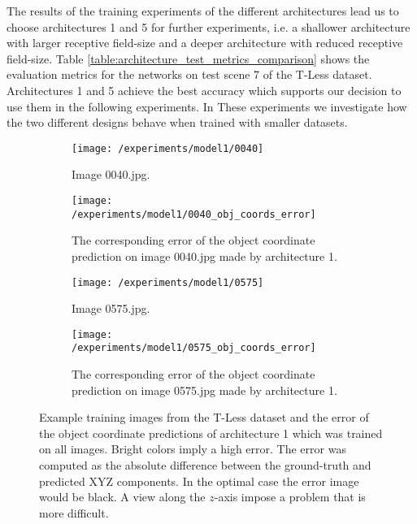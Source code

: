 The results of the training experiments of the different architectures lead us to choose architectures 1 and 5 for further experiments, i.e. a shallower architecture with larger receptive field-size and a deeper architecture with reduced receptive field-size. Table \ref{table:architecture_test_metrics_comparison} shows the evaluation metrics for the networks on test scene 7 of the T-Less dataset. Architectures 1 and 5 achieve the best accuracy which supports our decision to use them in the following experiments. In These experiments we investigate how the two different designs behave when trained with smaller datasets.

\begin{figure}[!tbp]
	\centering
	\vspace{5mm}
	\begin{subfigure}[t]{0.22\textwidth}
		\centering
    	\texttt{[image: /experiments/model1/0040]}
    	\caption{Image 0040.jpg.}
	\end{subfigure}
	\hfill
	\begin{subfigure}[t]{0.22\textwidth}
		\centering
    	\texttt{[image: /experiments/model1/0040\_obj\_coords\_error]}
    	\caption{The corresponding error of the object coordinate prediction on image 0040.jpg made by architecture 1.}
	\end{subfigure}
	\begin{subfigure}[t]{0.22\textwidth}
		\centering
    	\texttt{[image: /experiments/model1/0575]}
    	\caption{Image 0575.jpg.}
	\end{subfigure}
	\hfill
	\begin{subfigure}[t]{0.22\textwidth}
		\centering
    	\texttt{[image: /experiments/model1/0575\_obj\_coords\_error]}
    	\caption{The corresponding error of the object coordinate prediction on image 0575.jpg made by architecture 1.}
	\end{subfigure}
	\caption{Example training images from the T-Less dataset and the error of the object coordinate predictions of architecture 1 which was trained on all images. Bright colors imply a high error. The error was computed as the absolute difference between the ground-truth and predicted XYZ components. In the optimal case the error image would be black. A view along the $z$-axis impose a problem that is more difficult.}
	\label{fig:architecture_comparison_errors}
\end{figure}

